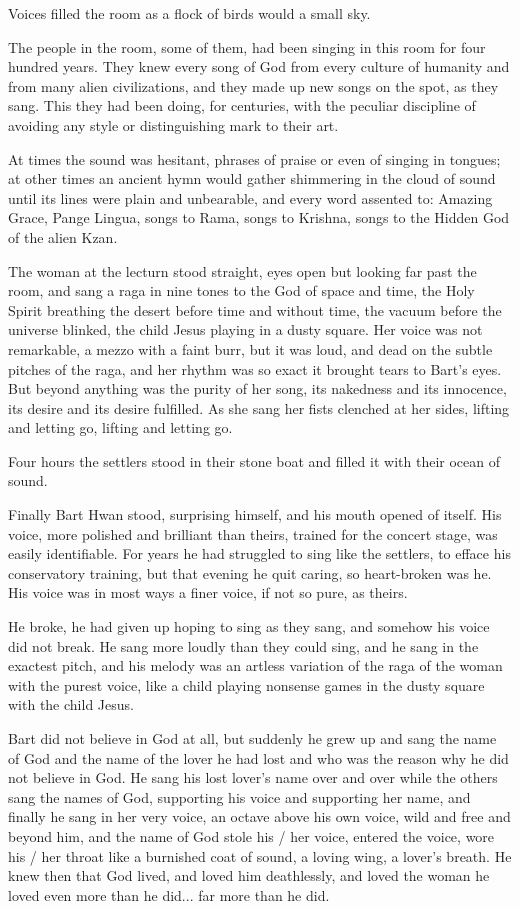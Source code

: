 \documentclass[english,11pt,letterpaper,onecolumn]{scrbook}
\begin{document}
	Voices filled the room as a flock of birds would a small sky. 

	The people in the room, some of them, had been singing in this room for four hundred years. They knew every song of God from every culture of humanity and from many alien civilizations, and they made up new songs on the spot, as they sang. This they had been doing, for centuries, with the peculiar discipline of avoiding any style or distinguishing mark to their art. 

	At times the sound was hesitant, phrases of praise or even of singing in tongues; at other times an ancient hymn would gather shimmering in the cloud of sound until its lines were plain and unbearable, and every word assented to: Amazing Grace, Pange Lingua, songs to Rama, songs to Krishna, songs to the Hidden God of the alien Kzan. 

	The woman at the lecturn stood straight, eyes open but looking far past the room, and sang a raga in nine tones to the God of space and time, the Holy Spirit breathing the desert before time and without time, the vacuum before the universe blinked, the child Jesus playing in a dusty square.  Her voice was not remarkable, a mezzo with a faint burr, but it was loud, and dead on the subtle pitches of the raga, and her rhythm was so exact it brought tears to Bart's eyes.  But beyond anything was the purity of her song, its nakedness and its innocence, its desire and its desire fulfilled. As she sang her fists clenched at her sides, lifting and letting go, lifting and letting go.

	Four hours the settlers stood in their stone boat and filled it with their ocean of sound.

	Finally Bart Hwan stood, surprising himself, and his mouth opened of itself. His voice, more polished and brilliant than theirs, trained for the concert stage, was easily identifiable. For years he had struggled to sing like the settlers, to efface his conservatory training, but that evening he quit caring, so heart-broken was he. His voice was in most ways a finer voice, if not so pure, as theirs.

	He broke, he had given up hoping to sing as they sang, and somehow his voice did not break. He sang more loudly than they could sing, and he sang in the exactest pitch, and his melody was an artless variation of the raga of the woman with the purest voice, like a child playing nonsense games in the dusty square with the child Jesus. 

	Bart did not believe in God at all, but suddenly he grew up and sang the name of God and the name of the lover he had lost and who was the reason why he did not believe in God.  He sang his lost lover's name over and over while the others sang the names of God, supporting his voice and supporting her name, and finally he sang in her very voice, an octave above his own voice, wild and free and beyond him, and the name of God stole his / her voice, entered the voice, wore his / her throat like a burnished coat of sound, a loving wing, a lover's breath. He knew then that God lived, and loved him deathlessly, and loved the woman he loved even more than he did...  far more than he did.
\end{document}
